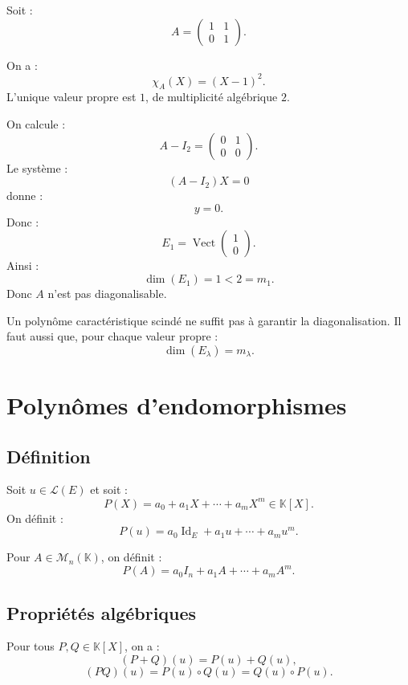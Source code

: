 \documentclass[11pt,a4paper]{article}
\newcommand{\K}{\mathbb K}
\newcommand{\M}{\mathcal M}
\newcommand{\Lcal}{\mathcal L}
\newcommand{\Vect}{\operatorname{Vect}}
\newcommand{\Id}{\operatorname{Id}}
\begin{document}
Soit :
\[
A=
\begin{pmatrix}
1&1\\
0&1
\end{pmatrix}.
\]

On a :
\[
\chi_A(X)=(X-1)^2.
\]
L'unique valeur propre est \(1\), de multiplicité algébrique \(2\).

On calcule :
\[
A-I_2=
\begin{pmatrix}
0&1\\
0&0
\end{pmatrix}.
\]
Le système :
\[
(A-I_2)X=0
\]
donne :
\[
y=0.
\]
Donc :
\[
E_1=\Vect
\begin{pmatrix}
1\\0
\end{pmatrix}.
\]
Ainsi :
\[
\dim(E_1)=1<2=m_1.
\]
Donc \(A\) n'est pas diagonalisable.

\begin{erreurbox}
Un polynôme caractéristique scindé ne suffit pas à garantir la diagonalisation.  
Il faut aussi que, pour chaque valeur propre :
\[
\dim(E_\lambda)=m_\lambda.
\]
\end{erreurbox}

\section{Polynômes d'endomorphismes}

\subsection{Définition}

\begin{definitionbox}
Soit \(u\in\Lcal(E)\) et soit :
\[
P(X)=a_0+a_1X+\cdots+a_mX^m\in\K[X].
\]
On définit :
\[
P(u)=a_0\Id_E+a_1u+\cdots+a_mu^m.
\]
\end{definitionbox}

\begin{definitionbox}
Pour \(A\in\M_n(\K)\), on définit :
\[
P(A)=a_0I_n+a_1A+\cdots+a_mA^m.
\]
\end{definitionbox}

\subsection{Propriétés algébriques}

\begin{theorembox}
Pour tous \(P,Q\in\K[X]\), on a :
\[
(P+Q)(u)=P(u)+Q(u),
\]
\[
(PQ)(u)=P(u)\circ Q(u)=Q(u)\circ P(u).
\]
\end{theorembox}
\end{document}
